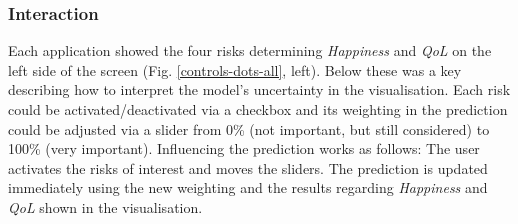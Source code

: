 \documentclass[final,5p,times,twocolumn,authoryear]{elsarticle}
\begin{document}






\subsubsection{Interaction} %
\label{sub:interaction}
Each application showed the four risks determining \emph{Happiness} and \emph{QoL} on the left side of the screen (Fig. \ref{controls-dots-all}, left). Below these was a key describing how to interpret the model's uncertainty in the visualisation. Each risk could be activated/deactivated via a checkbox and its weighting in the prediction could be adjusted via a slider from 0\% (not important, but still considered) to 100\% (very important). Influencing the prediction works as follows: The user activates the risks of interest and moves the sliders. The prediction is updated immediately using the new weighting and the results regarding \emph{Happiness} and \emph{QoL} shown in the visualisation. 
\end{document}
